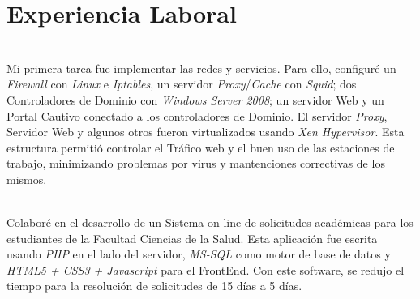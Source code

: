 \documentclass[]{cvStyle1}
\begin{document}
    \section*{Experiencia Laboral}
        {
            \begin{description}[leftmargin=0cm]
                \item [Administrador de Sistemas] \hfill \\
                Mi primera tarea fue implementar las redes y servicios. 
                Para ello, configur\'e un {\em Firewall} con {\em Linux} e {\em Iptables}, 
                un servidor {\em Proxy}/{\em Cache} con {\em Squid}; dos Controladores 
                de Dominio con {\em Windows Server 2008}; un servidor Web y 
                un Portal Cautivo conectado a los controladores de 
                Dominio. El servidor {\em Proxy}, Servidor Web y algunos otros
                fueron virtualizados usando {\em Xen Hypervisor}. Esta 
                estructura permiti\'o controlar el Tr\'afico web y el buen 
                uso de las estaciones de trabajo, minimizando problemas 
                por virus y mantenciones correctivas de los mismos.

                \item [Desarrollador de Aplicaciones] \hfill \\
                Colabor\'e en el desarrollo de un Sistema on-line de 
                solicitudes acad\'emicas para los estudiantes de la 
                Facultad Ciencias de la Salud. Esta aplicaci\'on fue 
                escrita usando {\em PHP} en el lado del servidor, {\em MS-SQL} 
                como motor de base de datos y {\em HTML5 + CSS3 + Javascript} 
                para el FrontEnd. Con este software, se redujo el tiempo
                para la resoluci\'on de solicitudes de 15 d\'ias a 5 d\'ias.
            
            \end{description}
        }
                     
\end{document}
